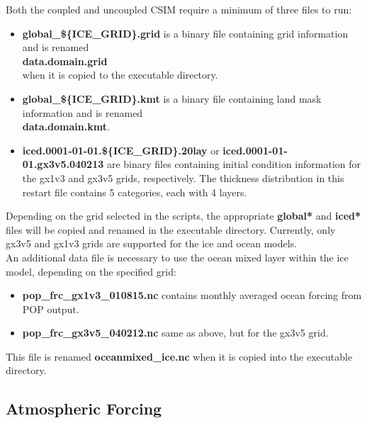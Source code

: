 
Both the coupled and uncoupled CSIM require a minimum of three files to run:

\begin{itemize}
  \item {\bf global\_\$\{ICE\_GRID\}.grid} is a binary file containing
        grid information and is renamed  \\
        {\bf data.domain.grid}  \\
        when it is copied to the executable directory.
  \item {\bf global\_\$\{ICE\_GRID\}.kmt} is a binary file containing
        land mask information and is renamed \\
        {\bf data.domain.kmt}.
  \item {\bf iced.0001-01-01.\$\{ICE\_GRID\}.20lay} or 
        {\bf iced.0001-01-01.gx3v5.040213} are binary files containing
         initial condition information for the gx1v3 and gx3v5 grids,
         respectively. The thickness distribution in this
         restart file contains 5 categories, each with 4 layers.
\end{itemize}

Depending on the grid selected in the scripts, the appropriate {\bf global*}
and {\bf iced*} files will be copied and renamed in the executable directory.
Currently, only gx3v5 and gx1v3 grids are supported for the ice and ocean
models.\\

An additional data file is necessary to use the ocean mixed layer within the
ice model, depending on the specified grid:
\begin{itemize}
  \item {\bf pop\_frc\_gx1v3\_010815.nc} contains monthly averaged ocean forcing
        from POP output.
  \item {\bf pop\_frc\_gx3v5\_040212.nc} same as above, but for the gx3v5 grid.
\end{itemize}

This file is renamed {\bf oceanmixed\_ice.nc} when it is copied into the executable
directory.

\subsection{Atmospheric Forcing}
\label{atm_forcing}

